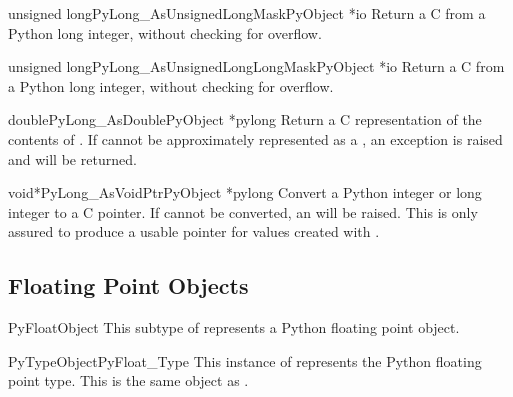 \begin{cfuncdesc}{unsigned long}{PyLong_AsUnsignedLongMask}{PyObject *io}
  Return a C  from a Python long integer, without
  checking for overflow.
\end{cfuncdesc}

\begin{cfuncdesc}{unsigned long}{PyLong_AsUnsignedLongLongMask}{PyObject *io}
  Return a C  from a Python long integer, without
  checking for overflow.
\end{cfuncdesc}

\begin{cfuncdesc}{double}{PyLong_AsDouble}{PyObject *pylong}
  Return a C  representation of the contents of
  .  If  cannot be approximately represented
  as a , an  exception is
  raised and  will be returned.
\end{cfuncdesc}

\begin{cfuncdesc}{void*}{PyLong_AsVoidPtr}{PyObject *pylong}
  Convert a Python integer or long integer  to a C
   pointer.  If  cannot be converted, an
   will be raised.  This is only assured to
  produce a usable  pointer for values created with
  .
\end{cfuncdesc}


\subsection{Floating Point Objects \label{floatObjects}}

\begin{ctypedesc}{PyFloatObject}
  This subtype of  represents a Python floating point
  object.
\end{ctypedesc}

\begin{cvardesc}{PyTypeObject}{PyFloat_Type}
  This instance of  represents the Python floating
  point type.  This is the same object as .
\end{cvardesc}

